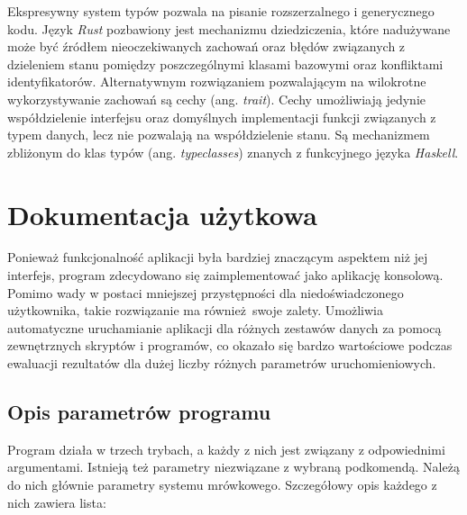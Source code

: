 {    Ekspresywny system typów pozwala na pisanie rozszerzalnego i generycznego kodu. Język \textit{Rust} pozbawiony jest
    mechanizmu dziedziczenia, które nadużywane może być źródłem nieoczekiwanych zachowań oraz błędów związanych z
    dzieleniem stanu pomiędzy poszczególnymi klasami bazowymi oraz konfliktami identyfikatorów. Alternatywnym
    rozwiązaniem pozwalającym na wilokrotne wykorzystywanie zachowań są cechy (ang. \textit{trait}). Cechy umożliwiają
    jedynie współdzielenie interfejsu oraz domyślnych implementacji funkcji związanych z typem danych, lecz nie
    pozwalają na współdzielenie stanu. Są mechanizmem zbliżonym do klas typów (ang. \textit{typeclasses}) znanych z
    funkcyjnego języka \textit{Haskell}.


    \section{Dokumentacja użytkowa}
    {
        Ponieważ funkcjonalność aplikacji była bardziej znaczącym aspektem niż jej interfejs, program zdecydowano się
        zaimplementować jako aplikację konsolową. Pomimo wady w postaci mniejszej przystępności dla niedoświadczonego
        użytkownika, takie rozwiązanie ma również swoje zalety. Umożliwia automatyczne uruchamianie aplikacji dla
        różnych zestawów danych za pomocą zewnętrznych skryptów i programów, co okazało się bardzo wartościowe podczas
        ewaluacji rezultatów dla dużej liczby różnych parametrów uruchomieniowych.

        \subsection{Opis parametrów programu}
        {
            Program działa w trzech trybach, a każdy z nich jest związany z odpowiednimi argumentami. Istnieją też
            parametry niezwiązane z wybraną podkomendą. Należą do nich głównie parametry systemu mrówkowego.
            Szczegółowy opis każdego z nich zawiera lista:

}}}
